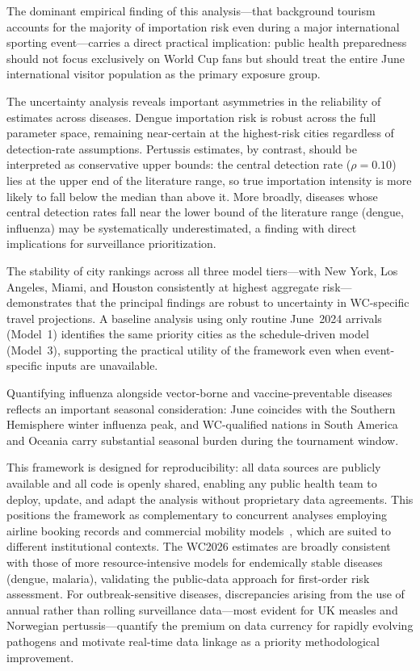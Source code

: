\documentclass[12pt]{article}
\begin{document}
The dominant empirical finding of this analysis---that background tourism
accounts for the majority of importation risk even during a major
international sporting event---carries a direct practical implication:
public health preparedness should not focus exclusively on World Cup fans
but should treat the entire June international visitor population as the
primary exposure group.

The uncertainty analysis reveals important asymmetries in the reliability of
estimates across diseases. Dengue importation risk is robust across the full
parameter space, remaining near-certain at the highest-risk cities regardless
of detection-rate assumptions. Pertussis estimates, by contrast, should be
interpreted as conservative upper bounds: the central detection rate
($\rho = 0.10$) lies at the upper end of the literature range, so true
importation intensity is more likely to fall below the median than above it.
More broadly, diseases whose central detection rates fall near the lower bound
of the literature range (dengue, influenza) may be systematically
underestimated, a finding with direct implications for surveillance
prioritization.

The stability of city rankings across all three model tiers---with New
York, Los Angeles, Miami, and Houston consistently at highest aggregate
risk---demonstrates that the principal findings are robust to uncertainty
in WC-specific travel projections. A baseline analysis using only routine
June~2024 arrivals (Model~1) identifies the same priority cities as the
schedule-driven model (Model~3), supporting the practical utility of the
framework even when event-specific inputs are unavailable.

Quantifying influenza alongside vector-borne and vaccine-preventable
diseases reflects an important seasonal consideration: June coincides
with the Southern Hemisphere winter influenza peak, and WC-qualified
nations in South America and Oceania carry substantial seasonal burden
during the tournament window.

This framework is designed for reproducibility: all data
sources are publicly available and all code is openly shared, enabling
any public health team to deploy, update, and adapt the analysis without
proprietary data agreements. This positions the framework as
complementary to concurrent analyses employing airline booking records
and commercial mobility models~\cite{epistorm2026}, which are suited to
different institutional contexts. The WC2026 estimates are broadly
consistent with those of more resource-intensive models for endemically
stable diseases (dengue, malaria), validating the public-data approach
for first-order risk assessment. For outbreak-sensitive diseases,
discrepancies arising from the use of annual rather than rolling
surveillance data---most evident for UK measles and Norwegian
pertussis---quantify the premium on data currency for rapidly evolving
pathogens and motivate real-time data linkage as a priority
methodological improvement.
\end{document}

